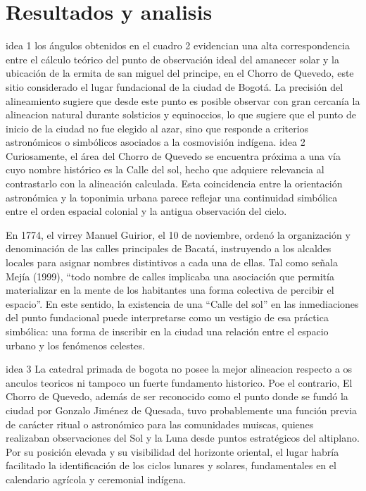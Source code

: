 \documentclass[a4paper,alpha-refs]{eSpectra}
\begin{document}
\justifying


\section{Resultados y analisis}
idea 1
los ángulos obtenidos en el cuadro 2 evidencian una alta correspondencia entre el cálculo teórico del punto de observación ideal del amanecer solar y la ubicación de la ermita de san miguel del principe, en el Chorro de Quevedo, este sitio considerado el lugar fundacional de la ciudad de Bogotá. La precisión del alineamiento sugiere que desde este punto es posible observar con gran cercanía la alineacion natural durante solsticios y equinoccios, lo que sugiere  que el punto de inicio de la ciudad no fue elegido al azar, sino que responde a criterios astronómicos o simbólicos asociados a la cosmovisión indígena.
idea 2
Curiosamente, el área del Chorro de Quevedo se encuentra próxima a una vía cuyo nombre histórico es la Calle del sol, hecho que adquiere relevancia al contrastarlo con la alineación calculada. Esta coincidencia entre la orientación astronómica y la toponimia urbana parece reflejar una continuidad simbólica entre el orden espacial colonial y la antigua observación del cielo.

En 1774, el virrey Manuel Guirior, el 10 de noviembre, ordenó la organización y denominación de las calles principales de Bacatá, instruyendo a los alcaldes locales para asignar nombres distintivos a cada una de ellas. Tal como señala Mejía (1999), “todo nombre de calles implicaba una asociación que permitía materializar en la mente de los habitantes una forma colectiva de percibir el espacio”. En este sentido, la existencia de una “Calle del sol” en las inmediaciones del punto fundacional puede interpretarse como un vestigio de esa práctica simbólica: una forma de inscribir en la ciudad una relación entre el espacio urbano y los fenómenos celestes.

idea 3
La catedral primada de bogota no posee la mejor alineacion respecto a os anculos teoricos ni tampoco un fuerte fundamento historico. Poe el contrario, El Chorro de Quevedo, además de ser reconocido como el punto donde se fundó la ciudad por Gonzalo Jiménez de Quesada, tuvo probablemente una función previa de carácter ritual o astronómico para las comunidades muiscas, quienes realizaban observaciones del Sol y la Luna desde puntos estratégicos del altiplano. Por su posición elevada y su visibilidad del horizonte oriental, el lugar habría facilitado la identificación de los ciclos lunares y solares, fundamentales en el calendario agrícola y ceremonial indígena.
\end{document}
